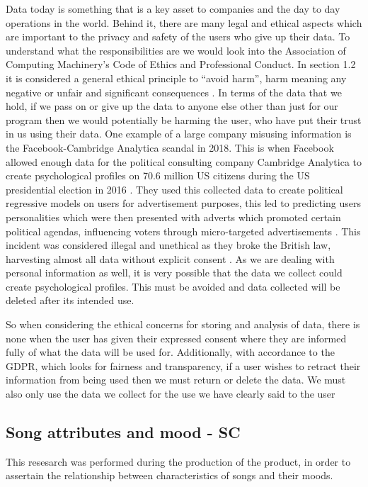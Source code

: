 \documentclass[10pt, notitlepage]{report}
\begin{document}
Data today is something that is a key asset to companies and the day to day operations in the world. Behind it, there are many legal and ethical aspects which are important to the privacy and safety of the users who give up their data. To understand what the responsibilities are we would look into the Association of Computing  Machinery’s Code of Ethics and Professional Conduct. In section 1.2 it is considered a general ethical principle to “avoid harm”, harm meaning any negative or unfair and significant consequences \cite{ComputingMachineryACM2018}. In terms of the data that we hold, if we pass on or give up the data to anyone else other than just for our program then we would potentially be harming the user, who have put their trust in us using their data. One example of a large company misusing information is the Facebook-Cambridge Analytica scandal in 2018. This is when Facebook allowed enough data for the political consulting company Cambridge Analytica to create psychological profiles on 70.6 million US citizens during the US presidential election in 2016 \cite{Horwitz2018}. They used this collected data to create political regressive models on users for advertisement purposes, this led to predicting users personalities which were then presented with adverts which promoted certain political agendas, influencing voters through micro-targeted advertisements \cite{Rathi2019}. This incident was considered illegal and unethical as they broke the British law, harvesting almost all data without explicit consent \cite{ASNC2018}. As we are dealing with personal information as well, it is very possible that the data we collect could create psychological profiles. This must be avoided and data collected will be deleted after its intended use.

So when considering the ethical concerns for storing and analysis of data, there is none when the user has given their expressed consent where they are informed fully of what the data will be used for. Additionally, with accordance to the GDPR, which looks for fairness and transparency, if a user wishes to retract their information from being used then we must return or delete the data. We must also only use the data we collect for the use we have clearly said to the user


\subsection{Song attributes and mood - SC}
\label{res:mood}

This resesarch was performed during the production of the product, in order to assertain the relationship between characteristics of songs and their moods.\newline
\end{document}
